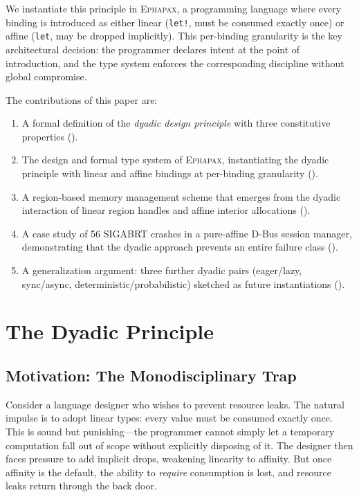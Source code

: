 \documentclass[11pt,a4paper]{article}
\newcommand{\Ephapax}{\textsc{Ephapax}}
\begin{document}
We instantiate this principle in \Ephapax{}, a programming language where every
binding is introduced as either linear (\lstinline{let!}, must be consumed
exactly once) or affine (\lstinline{let}, may be dropped implicitly). This
per-binding granularity is the key architectural decision: the programmer
declares intent at the point of introduction, and the type system enforces
the corresponding discipline without global compromise.

The contributions of this paper are:

\begin{enumerate}
  \item A formal definition of the \emph{dyadic design principle} with three
    constitutive properties ().
  \item The design and formal type system of \Ephapax{}, instantiating the
    dyadic principle with linear and affine bindings at per-binding granularity
    ().
  \item A region-based memory management scheme that emerges from the dyadic
    interaction of linear region handles and affine interior allocations
    ().
  \item A case study of 56 SIGABRT crashes in a pure-affine D-Bus session
    manager, demonstrating that the dyadic approach prevents an entire failure
    class ().
  \item A generalization argument: three further dyadic pairs (eager/lazy,
    sync/async, deterministic/probabilistic) sketched as future instantiations
    ().
\end{enumerate}

\section{The Dyadic Principle}
\label{sec:dyadic-principle}

\subsection{Motivation: The Monodisciplinary Trap}

Consider a language designer who wishes to prevent resource leaks. The natural
impulse is to adopt linear types: every value must be consumed exactly once.
This is sound but punishing---the programmer cannot simply let a temporary
computation fall out of scope without explicitly disposing of it. The designer
then faces pressure to add implicit drops, weakening linearity to affinity.
But once affinity is the default, the ability to \emph{require} consumption
is lost, and resource leaks return through the back door.
\end{document}
